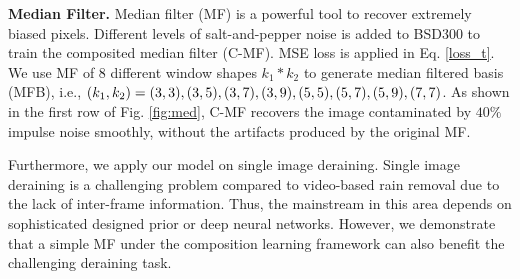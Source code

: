 \documentclass[twocolumn]{svjour3}          %
\begin{document}
 \begin{figure*}[!th] 
	 			\end{figure*}

\textbf{Median Filter.}
Median filter (MF) is a powerful tool to recover extremely biased pixels. Different levels of salt-and-pepper noise is added to BSD300 to train the composited median filter (C-MF). MSE loss is applied in Eq. \ref{loss_t}. We use MF of 8 different window shapes $k_{1}*k_{2}$ to generate median filtered basis (MFB), i.e., $(k_{1},k_{2})=(3,3),(3,5),(3,7),(3,9),(5,5),(5,7),\\ (5,9),(7,7)$. As shown in the first row of Fig. \ref{fig:med}, C-MF recovers the image contaminated by $40\%$ impulse noise smoothly, without the artifacts produced by the original MF.


Furthermore, we apply our model on single image deraining. Single image deraining is a challenging problem compared to video-based rain removal due to the lack of inter-frame information. Thus, the mainstream in this area depends on sophisticated designed prior or deep neural networks. However, we demonstrate that a simple MF under the composition learning framework can also benefit the challenging deraining task.
\end{document}
